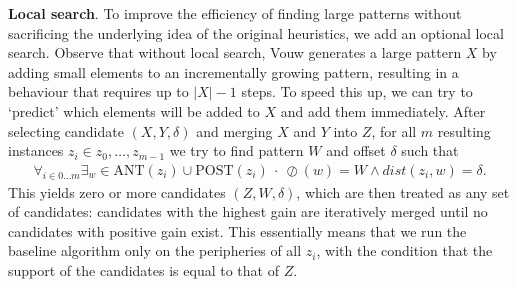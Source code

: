 \documentclass{llncs}
\begin{document}
\smallskip
\noindent \textbf{Local search}. %
To improve the efficiency of finding large patterns without sacrificing the underlying idea of the original heuristics, we add an optional local search. Observe that without local search, Vouw generates a large pattern $X$ by adding small elements to an incrementally growing pattern, resulting in a behaviour that requires up to $|X|-1$ steps. To speed this up, we can try to `predict' which elements will be added to $X$ and add them immediately. After selecting candidate $(X,Y,\delta)$ and merging $X$ and $Y$ into $Z$, for all $m$ resulting instances $z_i \in {z_0,\dots,z_{m-1}}$ we try to find pattern $W$ and offset $\delta$ such that
\begin{align}
\label{floodfill}
\forall_{i\in 0\dots m} \exists_w \in \mathrm{ANT}(z_i) \cup \mathrm{POST}(z_i) \ \cdot \ \oslash(w) = W \land dist(z_i, w) = \delta.
\end{align}
\noindent This yields zero or more candidates $(Z,W,\delta)$, which are then treated as any set of candidates: candidates with the highest gain are iteratively merged until no candidates with positive gain exist. This essentially means that we run the baseline algorithm only on the peripheries of all $z_i$, with the condition that the support of the candidates is equal to that of $Z$. %

\end{document}
